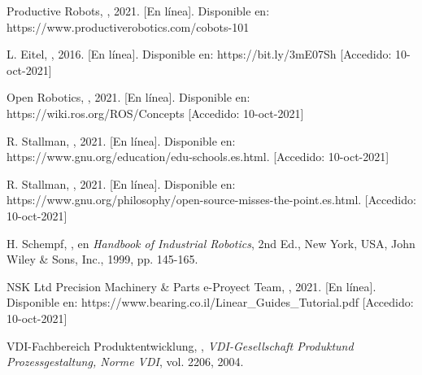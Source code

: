 \begin{thebibliography}{10} %

 Productive Robots, , 2021. [En línea]. Disponible en: https://www.productiverobotics.com/cobots-101


L. Eitel, , 2016. [En línea]. Disponible en: https://bit.ly/3mE07Sh [Accedido: 10-oct-2021]

Open Robotics, , 2021. [En línea]. Disponible en: https://wiki.ros.org/ROS/Concepts [Accedido: 10-oct-2021]


 R. Stallman, , 2021. [En línea]. Disponible en: https://www.gnu.org/education/edu-schools.es.html. [Accedido: 10-oct-2021]

R. Stallman, , 2021. [En línea]. Disponible en: https://www.gnu.org/philosophy/open-source-misses-the-point.es.html. [Accedido: 10-oct-2021]

H. Schempf, , en  \emph{Handbook of Industrial Robotics}, 2nd Ed., New York, USA, John Wiley \& Sons, Inc., 1999, pp. 145-165.

NSK Ltd Precision Machinery \& Parts e-Proyect Team, , 2021. [En línea]. Disponible en: https://www.bearing.co.il/Linear\_Guides\_Tutorial.pdf [Accedido: 10-oct-2021]

VDI-Fachbereich Produktentwicklung, , \textit{VDI-Gesellschaft Produktund Prozessgestaltung, Norme VDI}, vol. 2206, 2004.

\end{thebibliography}


